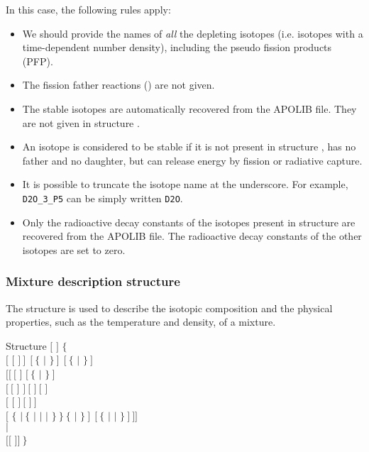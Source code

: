\vskip 0.15cm

In this case, the following rules apply:
\begin{itemize}
\item We should provide the names  of {\sl all} the depleting
isotopes (i.e. isotopes with a time-dependent number density), including the
pseudo fission products (PFP).
\item The fission father reactions () are not given.
\item The stable isotopes are automatically recovered from the
APOLIB file. They are not given in structure .
\item An isotope is considered to be stable if it is not present in
structure , has no father and no daughter,
but can release energy by fission or radiative capture.
\item It is possible to truncate the isotope name  at the
underscore. For example, {\tt D2O\_3\_P5} can be simply written {\tt D2O}.
\item Only the radioactive decay constants of the isotopes present in
structure  are recovered from the APOLIB file. The
radioactive decay constants of the other isotopes are set to zero.
\end{itemize}

\subsubsection{Mixture description structure}\label{sect:descmix1}

The structure  is used to describe the isotopic composition and
the physical properties, such as the temperature and density, of a mixture.

\begin{DataStructure}{Structure }
 $[$  $]$ $\{$ \\
\hskip 1.0cm $[$ $[$  $]~]~~[~\{$  $|$  $\}~]~~[~\{$ 
    $|$ $\}~]$\\
\hskip 2.0cm $[[~[$  \moc{=} $]$   $[~\{$  
    $|$  $\}~]$\\
\hskip 2.0cm $[~[$  $]$  $]~[$   $]~[$   $]$ \\
\hskip 2.0cm $[$    $[$   $]~[$  $]~]$ \\
\hskip 2.0cm $[$  $\{$  $|~\{$  $|$  $|$  $|$  $\}~\}~\{$
 $|$  $\}~]~~[~\{$  $|$  $|$  $\}~]~]]$ \\
\hskip 1.0cm $|$ \\
\hskip 1.0cm  $[[$   $]]~\}$
\end{DataStructure}

